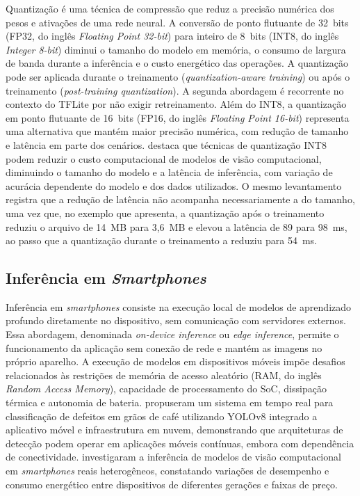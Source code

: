 \documentclass[artigo,times,capa]{iftex2024}
\begin{document}
Quantização é uma técnica de compressão que reduz a precisão numérica dos pesos e ativações de uma rede neural. A conversão de ponto flutuante de 32~bits (FP32, do inglês \textit{Floating Point 32-bit}) para inteiro de 8~bits (INT8, do inglês \textit{Integer 8-bit}) diminui o tamanho do modelo em memória, o consumo de largura de banda durante a inferência e o custo energético das operações. A quantização pode ser aplicada durante o treinamento (\textit{quantization-aware training}) ou após o treinamento (\textit{post-training quantization}). A segunda abordagem é recorrente no contexto do \ac{TFLite} por não exigir retreinamento. Além do \ac{INT8}, a quantização em ponto flutuante de 16~bits (FP16, do inglês \textit{Floating Point 16-bit}) representa uma alternativa que mantém maior precisão numérica, com redução de tamanho e latência em parte dos cenários. \textcite{Menghani2023Efficient} destaca que técnicas de quantização \ac{INT8} podem reduzir o custo computacional de modelos de visão computacional, diminuindo o tamanho do modelo e a latência de inferência, com variação de acurácia dependente do modelo e dos dados utilizados. O mesmo levantamento registra que a redução de latência não acompanha necessariamente a do tamanho, uma vez que, no exemplo que apresenta, a quantização após o treinamento reduziu o arquivo de 14~MB para 3,6~MB e elevou a latência de 89 para 98~ms, ao passo que a quantização durante o treinamento a reduziu para 54~ms.
 
\subsection{Inferência em \textit{Smartphones}}

Inferência em \textit{smartphones} consiste na execução local de modelos de
aprendizado profundo diretamente no dispositivo, sem comunicação com servidores
externos. Essa abordagem, denominada \textit{on-device inference} ou
\textit{edge inference}, permite o funcionamento da aplicação sem conexão de rede
e mantém as imagens no próprio aparelho. A execução de modelos em dispositivos móveis impõe
desafios relacionados às restrições de memória de acesso aleatório (RAM, do inglês \textit{Random Access Memory}), capacidade de processamento
do \ac{SoC}, dissipação térmica e autonomia de bateria.
\textcite{Thai2024Coffee} propuseram um sistema em tempo real para
classificação de defeitos em grãos de café utilizando YOLOv8 integrado a
aplicativo móvel e infraestrutura em nuvem, demonstrando que arquiteturas
de detecção podem operar em aplicações móveis contínuas, embora com
dependência de conectividade. \textcite{Hirsch2025Exploring} investigaram a
inferência de modelos de visão computacional em \textit{smartphones} reais
heterogêneos, constatando variações de desempenho e consumo
energético entre dispositivos de diferentes gerações e faixas de preço.
 
\end{document}
